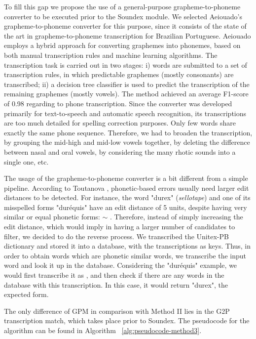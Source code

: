 To fill this gap we propose the use of a general-purpose grapheme-to-phoneme converter to be executed prior to the Soundex module. We selected Aeiouado's grapheme-to-phoneme converter \cite{Mendonca2014} 
for this purpose, since it consists of the state of the art in grapheme-to-phoneme transcription for Brazilian Portuguese. 
Aeiouado employs a hybrid approach for converting graphemes into phonemes, based on both manual transcription rules and machine learning algorithms. The transcription task is carried out in two stages: i) words are submitted to a set of transcription rules, in which predictable graphemes (mostly consonants) are transcribed; ii) a decision tree classifier is used to predict the transcription of the remaining graphemes (mostly vowels). The method achieved an average F1-score of 0.98 regarding to phone transcription. 
Since the converter was developed primarily for text-to-speech and automatic speech recognition, its transcriptions are too much detailed for spelling correction purposes. Only few words share exactly the same phone sequence. Therefore, we had to broaden the transcription, by grouping the mid-high and mid-low vowels together, by deleting the difference between nasal and oral vowels, by considering the many rhotic sounds into a single one, etc.

The usage of the grapheme-to-phoneme converter is a bit different from a simple pipeline. According to Toutanova \cite{Toutanova2002}, phonetic-based errors usually need larger edit distances to be detected. For instance, the word "durex" (\emph{sellotape}) and one of its misspelled forms "dur\'equis" have an edit distance of 5 units, despite having very similar or equal phonetic forms: \textipa{[du'rEks]} $\sim$ \textipa{[du'rEkIs]}. Therefore, instead of simply increasing the edit distance, which would imply in having a larger number of candidates to filter, we decided to do the reverse process. We transcribed the Unitex-PB dictionary and stored it into a database, with the transcriptions as keys. Thus, in order to obtain words which are phonetic similar words, we transcribe the input word and look it up in the database. Considering the "dur\'equis" example, we would first transcribe it as \textipa{[du'rE.kIs]}, and then check if there are any words in the database with this transcription. In this case, it would return "durex", the expected form.

The only difference of GPM in comparison with Method II lies in the G2P transcription match, which takes place prior to Soundex. The pseudocode for the algorithm can be found in Algorithm~ \ref{alg:pseudocode-method3}. 

